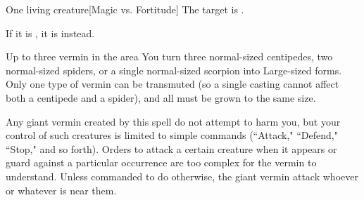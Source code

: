 \begin{spellheader}
    \spellrng{\rngmed}
\end{spellheader}
\begin{spelleffects}
    \begin{spelltarget}{One living creature}[Magic vs. Fortitude]
        \spellsuccess The target is \sickened.

        If it is \bloodied, it is \nauseated instead.
    \end{spelltarget}
\end{spelleffects}
\begin{spellfooter}
    
\end{spellfooter}

\begin{spellheader}
    \spelldur{\durmed}
\end{spellheader}
\begin{spelleffects}
    \begin{spelltarget}{Up to three vermin in the area}
        \spelleffect You turn three normal-sized centipedes, two normal-sized spiders, or a single normal-sized scorpion into Large-sized forms. Only one type of vermin can be transmuted (so a single casting cannot affect both a centipede and a spider), and all must be grown to the same size.
        \par Any giant vermin created by this spell do not attempt to harm you, but your control of such creatures is limited to simple commands (``Attack," ``Defend," ``Stop," and so forth). Orders to attack a certain creature when it appears or guard against a particular occurrence are too complex for the vermin to understand. Unless commanded to do otherwise, the giant vermin attack whoever or whatever is near them.
    \end{spelltarget}
\end{spelleffects}
\begin{spellfooter}
    
\end{spellfooter}

